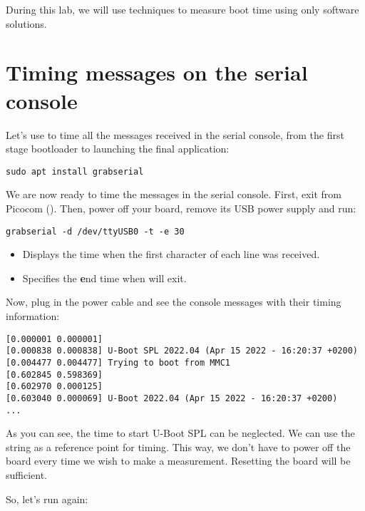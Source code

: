 
During this lab, we will use techniques to measure boot time using only
software solutions.

\section{Timing messages on the serial console}

Let's use  to time all the messages received in the
serial console, from the first stage bootloader to launching the final
application:

\begin{verbatim}
sudo apt install grabserial
\end{verbatim}

We are now ready to time the messages in the serial console. First, exit
from Picocom (\code{[Ctrl][a] [Ctrl][x]}). Then, power off your board,
remove its USB power supply and run:

\begin{verbatim}
grabserial -d /dev/ttyUSB0 -t -e 30
\end{verbatim}

\begin{itemize}
\item {} Displays the time when the first character of each line
was received.
\item {} Specifies the {\bf e}nd time when 
will exit.
\end{itemize}

Now, plug in the power cable and see the console messages with their
timing information:

\begin{verbatim}
[0.000001 0.000001]
[0.000838 0.000838] U-Boot SPL 2022.04 (Apr 15 2022 - 16:20:37 +0200)
[0.004477 0.004477] Trying to boot from MMC1
[0.602845 0.598369]
[0.602970 0.000125]
[0.603040 0.000069] U-Boot 2022.04 (Apr 15 2022 - 16:20:37 +0200)
...
\end{verbatim}

As you can see, the time to start U-Boot SPL can be neglected. We can
use the  string as a reference point for timing. This way,
we don't have to power off the board every time we wish to make a
measurement. Resetting the board will be sufficient.

So, let's run  again:

